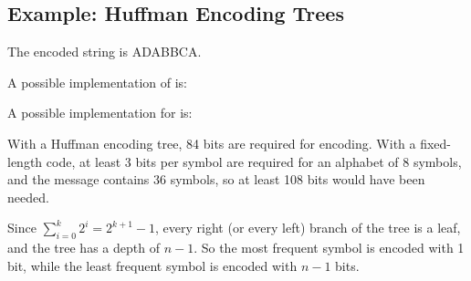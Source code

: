 \subsection{Example: Huffman Encoding Trees}

\begin{exe}[2.67]
    The encoded string is ADABBCA.
\end{exe}

\begin{exe}[2.68]
    \label{2.68}
    A possible implementation of  is:
\end{exe}

\begin{exe}[2.69]
    A possible implementation for  is:
\end{exe}

\begin{exe}[2.70]
    With a Huffman encoding tree, 84 bits are required for encoding.
    With a fixed-length code, at least 3 bits per symbol are required for an 
    alphabet of 8 symbols, and the message contains 36 symbols, so at least 108 
    bits would have been needed.
\end{exe}

\begin{exe}[2.71]
    \label{2.71}
    Since $\sum_{i = 0}^{k} 2^i = 2^{k + 1} - 1$, every right (or every left) 
    branch of the tree is a leaf, and the tree has a depth of $n - 1$. So the 
    most frequent symbol is encoded with 1 bit, while the least frequent symbol 
    is encoded with $n - 1$ bits.
\end{exe}

